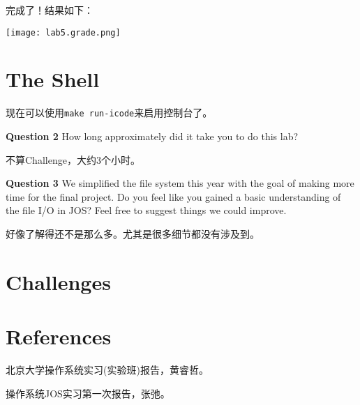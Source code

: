 \documentclass[11pt]{article}
\begin{document}
完成了！结果如下：
\begin{center}
\texttt{[image: lab5.grade.png]}
\end{center}

\section{The Shell}
现在可以使用\lstinline|make run-icode|来启用控制台了。
\begin{framed}
\noindent\textbf{Question 2} How long approximately did it take you to do this lab?
\end{framed}

不算Challenge，大约3个小时。

\begin{framed}
\noindent\textbf{Question 3} We simplified the file system this year with the goal of making more time for the final project. Do you feel like you gained a basic understanding of the file I/O in JOS? Feel free to suggest things we could improve.
\end{framed}

好像了解得还不是那么多。尤其是很多细节都没有涉及到。

\section{Challenges}

\section{References}
北京大学操作系统实习(实验班)报告，黄睿哲。

操作系统JOS实习第一次报告，张弛。
\end{document}
